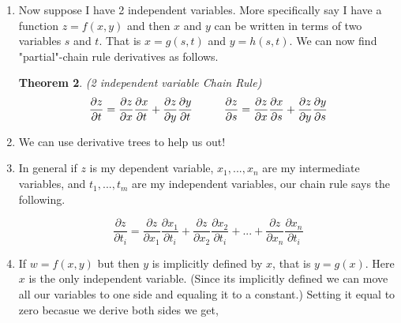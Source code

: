 \documentclass[11pt]{article}
\newtheorem{theorem}{Theorem}
\begin{document}
\begin{enumerate}
\begin{theorem}
or EQUIVALENTLY 

\begin{equation*}
    \frac{dz}{dt} = \frac{\partial z}{\partial x} \frac{dx}{dt} + \frac{\partial z}{\partial y} \frac{dy}{dt}
\end{equation*}
    
\end{theorem}


\item Now suppose I have 2 independent variables. More specifically say I have a function $z=f(x,y)$ and then $x$ and $y$ can be written in terms of two variables $s$ and $t$. That is $x = g(s,t)$ and $y = h(s,t)$. We can now find "partial"-chain rule derivatives as follows.

\begin{theorem}(2 independent variable Chain Rule)
\begin{equation*}
    \frac{\partial z}{\partial t} = \frac{\partial z}{\partial x} \frac{\partial x}{\partial t} + \frac{\partial z}{\partial y} \frac{\partial y}{\partial t} \hspace{ 1 cm} \frac{\partial z}{\partial s} = \frac{\partial z}{\partial x} \frac{\partial x}{\partial s} + \frac{\partial z}{\partial y} \frac{\partial y}{\partial s}
\end{equation*}

    
\end{theorem}

\item We can use derivative trees to help us out!

\item In general if $z$ is my dependent variable, $x_1,...,x_n$ are my intermediate variables, and $t_1,...,t_m$ are my independent variables, our chain rule says the following.

\begin{equation*}
\frac{\partial z}{\partial t_i} = \frac{\partial z}{\partial x_1}\frac{\partial x_1 }{\partial t_i}+ \frac{\partial z}{\partial x_2}\frac{\partial x_2 }{\partial t_i} + ... + \frac{\partial z}{\partial x_n}\frac{\partial x_n }{\partial t_i}
\end{equation*}


\item If $w=f(x,y)$ but then $y$ is implicitly defined by $x$, that is $y = g(x)$. Here $x$ is the only independent variable. (Since its implicitly defined we can move all our variables to one side and equaling it to a constant.) Setting it equal to zero becasue we derive both sides we get,


\end{enumerate}
\end{document}
